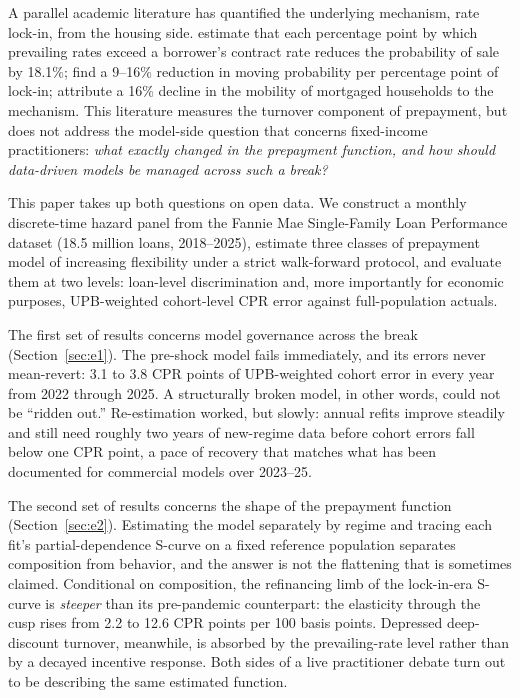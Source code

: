 \documentclass[11pt]{article}
\begin{document}
A parallel academic literature has quantified the underlying mechanism, rate lock-in, from the
housing side. \citet{batzer2024lockin} estimate that each percentage point by which prevailing
rates exceed a borrower's contract rate reduces the probability of sale by 18.1\%;
\citet{fonseca2024lockin} find a 9--16\% reduction in moving probability per percentage point of
lock-in; \citet{liebersohn2025mobility} attribute a 16\% decline in the mobility of mortgaged
households to the mechanism. This literature measures the turnover component of prepayment, but
does not address the model-side question that concerns fixed-income practitioners: \emph{what
exactly changed in the prepayment function, and how should data-driven models be managed across
such a break?}

This paper takes up both questions on open data. We construct a monthly discrete-time hazard panel from the Fannie
Mae Single-Family Loan Performance dataset (18.5 million loans, 2018--2025), estimate three
classes of prepayment model of increasing flexibility under a strict walk-forward protocol, and
evaluate them at two levels: loan-level discrimination and, more importantly for economic
purposes, UPB-weighted cohort-level CPR error against full-population actuals.

The first set of results concerns model governance across the break
(Section~\ref{sec:e1}). The pre-shock model fails immediately, and its errors never
mean-revert: 3.1 to 3.8 CPR points of UPB-weighted cohort error in every year from 2022 through
2025. A structurally broken model, in other words, could not be ``ridden out.'' Re-estimation
worked, but slowly: annual refits improve steadily and still need roughly two years of
new-regime data before cohort errors fall below one CPR point, a pace of recovery that matches
what has been documented for commercial models over 2023--25.

The second set of results concerns the shape of the prepayment function
(Section~\ref{sec:e2}). Estimating the model separately by regime and tracing each fit's
partial-dependence S-curve on a fixed reference population separates composition from behavior,
and the answer is not the flattening that is sometimes claimed. Conditional on composition, the
refinancing limb of the lock-in-era S-curve is \emph{steeper} than its pre-pandemic
counterpart: the elasticity through the cusp rises from 2.2 to 12.6 CPR points per 100 basis
points. Depressed deep-discount turnover, meanwhile, is absorbed by the prevailing-rate level
rather than by a decayed incentive response. Both sides of a live practitioner debate
\citep{sancap2024scurves, katz2024models} turn out to be describing the same estimated function.
\end{document}
